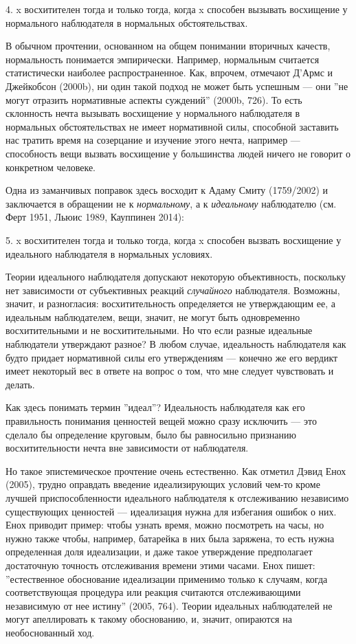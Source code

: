 \documentclass[11pt]{book}
\begin{document}
\smallskip

4. x восхитителен тогда и только тогда, когда x способен вызывать восхищение у нормального наблюдателя в нормальных обстоятельствах.

\smallskip

В обычном прочтении, основанном на общем понимании вторичных качеств, нормальность понимается эмпирически. Например, нормальным считается статистически наиболее распространенное. Как, впрочем, отмечают Д'Армс и Джейкобсон (2000b), ни один такой подход не может быть успешным --- они ''не могут отразить нормативные аспекты суждений'' (2000b, 726). То есть склонность нечта вызывать восхищение у нормального наблюдателя в нормальных обстоятельствах не имеет нормативной силы, способной заставить нас тратить время на созерцание и изучение этого нечта, например --- способность вещи вызвать восхищение у большинства людей ничего не говорит о конкретном человеке.

Одна из заманчивых поправок здесь восходит к Адаму Смиту (1759/2002) и заключается в обращении не к \textit{нормальному}, а к \textit{идеальному} наблюдателю (см. Ферт 1951, Льюис 1989, Кауппинен 2014):

\smallskip

5. x восхитителен тогда и только тогда, когда x способен вызвать восхищение у идеального наблюдателя в нормальных условиях.

\smallskip

Теории идеального наблюдателя допускают некоторую объективность, поскольку нет зависимости от субъективных реакций \textit{случайного} наблюдателя. Возможны, значит, и разногласия: восхитительность определяется не утверждающим ее, а идеальным наблюдателем, вещи, значит, не могут быть одновременно восхитительными и не восхитительными. Но что если разные идеальные наблюдатели утверждают разное? В любом случае, идеальность наблюдателя как будто придает нормативной силы его утверждениям --- конечно же его вердикт имеет некоторый вес в ответе на вопрос о том, что мне следует чувствовать и делать.

Как здесь понимать термин ''идеал''? Идеальность наблюдателя как его правильность понимания ценностей вещей можно сразу исключить --- это сделало бы определение круговым, было бы равносильно признанию восхитительности нечта вне зависимости от наблюдателя.

Но такое эпистемическое прочтение очень естественно. Как отметил Дэвид Енох (2005), трудно оправдать введение идеализирующих условий чем-то кроме лучшей приспособленности идеального наблюдателя к отслеживанию независимо существующих ценностей --- идеализация нужна для избегания ошибок о них. Енох приводит пример: чтобы узнать время, можно посмотреть на часы, но нужно также чтобы, например, батарейка в них была заряжена, то есть нужна определенная доля идеализации, и даже такое утверждение предполагает достаточную точность отслеживания времени этими часами. Енох пишет: ''естественное обоснование идеализации применимо только к случаям, когда соответствующая процедура или реакция считаются отслеживающими независимую от нее истину'' (2005, 764). Теории идеальных наблюдателей не могут апеллировать к такому обоснованию, и, значит, опираются на необоснованный ход.
\end{document}
